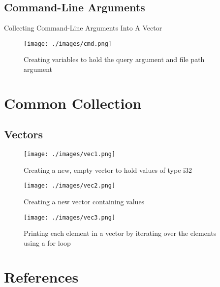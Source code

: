 \documentclass[10pt]{beamer}
\begin{document}
\subsection{Command-Line Arguments}
\begin{frame}{Collecting Command-Line Arguments Into A Vector}
    \begin{figure}[htpb]
        \centering
        \texttt{[image: ./images/cmd.png]}
        \caption{Creating variables to hold the query argument and file path argument\cite{rust-book}}
    \end{figure}
\end{frame}

\section{Common Collection}
\subsection{Vectors}
\begin{frame}
    \begin{figure}[htpb]
        \centering
        \texttt{[image: ./images/vec1.png]}
        \caption{Creating a new, empty vector to hold values of type i32\cite{rust-book}}
    \end{figure}

    \begin{figure}[htpb]
        \centering
        \texttt{[image: ./images/vec2.png]}
        \caption{Creating a new vector containing values\cite{rust-book}}
    \end{figure}

    \begin{figure}[htpb]
        \centering
        \texttt{[image: ./images/vec3.png]}
        \caption{Printing each element in a vector by iterating over the elements using a for loop\cite{rust-book}}
    \end{figure}
\end{frame}

\section*{References}


\end{document}
